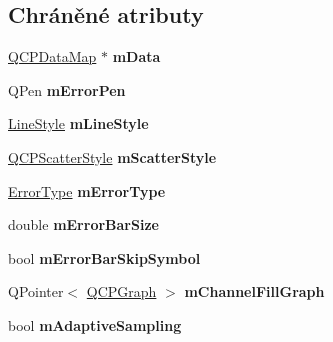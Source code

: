 \subsection*{Chráněné atributy}
\begin{DoxyCompactItemize}
\item 
\hypertarget{classQCPGraph_a8457c840f69a0ac49f61d30a509c5d08}{}\hyperlink{qcustomplot_8h_a84a9c4a4c2216ccfdcb5f3067cda76e3}{Q\+C\+P\+Data\+Map} $\ast$ {\bfseries m\+Data}\label{classQCPGraph_a8457c840f69a0ac49f61d30a509c5d08}

\item 
\hypertarget{classQCPGraph_aa35681a24165c2831301091a87b662ce}{}Q\+Pen {\bfseries m\+Error\+Pen}\label{classQCPGraph_aa35681a24165c2831301091a87b662ce}

\item 
\hypertarget{classQCPGraph_a8604fd98402035a63375849f7341ee25}{}\hyperlink{classQCPGraph_ad60175cd9b5cac937c5ee685c32c0859}{Line\+Style} {\bfseries m\+Line\+Style}\label{classQCPGraph_a8604fd98402035a63375849f7341ee25}

\item 
\hypertarget{classQCPGraph_a4aa36241f166ccd1f75fc8f24e4a3247}{}\hyperlink{classQCPScatterStyle}{Q\+C\+P\+Scatter\+Style} {\bfseries m\+Scatter\+Style}\label{classQCPGraph_a4aa36241f166ccd1f75fc8f24e4a3247}

\item 
\hypertarget{classQCPGraph_a29e64273db201aeadebc61c870720a36}{}\hyperlink{classQCPGraph_ad23b514404bd2cb3216f57c90904d6af}{Error\+Type} {\bfseries m\+Error\+Type}\label{classQCPGraph_a29e64273db201aeadebc61c870720a36}

\item 
\hypertarget{classQCPGraph_a7b51c8d09510f9d195b5e765ccbcf05b}{}double {\bfseries m\+Error\+Bar\+Size}\label{classQCPGraph_a7b51c8d09510f9d195b5e765ccbcf05b}

\item 
\hypertarget{classQCPGraph_acf631d7dbd1055a69ab3b63094868557}{}bool {\bfseries m\+Error\+Bar\+Skip\+Symbol}\label{classQCPGraph_acf631d7dbd1055a69ab3b63094868557}

\item 
\hypertarget{classQCPGraph_a2f1777c7accf8244fc640c33f0b04577}{}Q\+Pointer$<$ \hyperlink{classQCPGraph}{Q\+C\+P\+Graph} $>$ {\bfseries m\+Channel\+Fill\+Graph}\label{classQCPGraph_a2f1777c7accf8244fc640c33f0b04577}

\item 
\hypertarget{classQCPGraph_aa951e78aeba714cf443be6da2e52502e}{}bool {\bfseries m\+Adaptive\+Sampling}\label{classQCPGraph_aa951e78aeba714cf443be6da2e52502e}

\end{DoxyCompactItemize}
